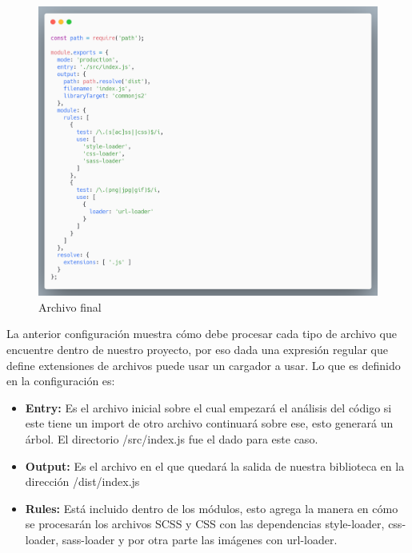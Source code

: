      \begin{figure}[H]
    \includegraphics[width=1\textwidth]{./Imagenes/image2.png}
     \caption[Archivo final]{Archivo final}
         \end{figure}
    \newline
    La anterior configuración muestra cómo debe procesar cada tipo de archivo que encuentre dentro de nuestro proyecto, por eso dada una expresión regular que define extensiones de archivos puede usar un cargador a usar.
    Lo que es definido en la configuración es:
    \begin{itemize}
    \item \textbf{Entry: } Es el archivo inicial sobre el cual empezará el análisis del código si este tiene un import de otro archivo continuará sobre ese, esto generará un árbol. El directorio /src/index.js fue el dado para este caso.
    \item \textbf{Output: } Es el archivo en el que quedará la salida de nuestra biblioteca en la dirección /dist/index.js
    \item \textbf{Rules: }Está incluido dentro de los módulos, esto agrega la manera en cómo se procesarán los archivos SCSS y CSS  con las dependencias style-loader, css-loader, sass-loader y por otra parte las imágenes con url-loader.
    \end{itemize}
    
    
